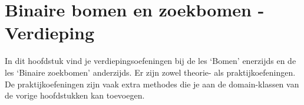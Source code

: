 \chapter{Binaire bomen en zoekbomen - Verdieping}

%
%

In dit hoofdstuk vind je verdiepingsoefeningen bij de les `Bomen' enerzijds en de les `Binaire zoekbomen' anderzijds. Er zijn zowel theorie- als praktijkoefeningen. De praktijkoefeningen zijn vaak extra methodes die je aan de domain-klassen van de vorige hoofdstukken kan toevoegen.


